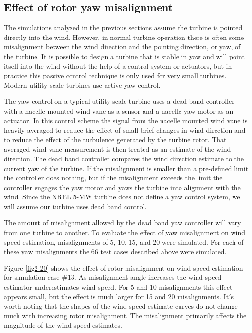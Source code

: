 \subsection{Effect of rotor yaw misalignment}\label{section2-4-2} 

The simulations analyzed in the previous sections assume the turbine is pointed directly into the wind. However, in normal turbine operation there is often some misalignment between the wind direction and the pointing direction, or yaw, of the turbine. It is possible to design a turbine that is stable in yaw and will point itself into the wind without the help of a control system or actuators, but in practice this passive control technique is only used for very small turbines. Modern utility scale turbines use active yaw control.\cite{burton2011}

The yaw control on a typical utility scale turbine uses a dead band controller with a nacelle mounted wind vane as a sensor and a nacelle yaw motor as an actuator.\cite{burton2011} In this control scheme the signal from the nacelle mounted wind vane is heavily averaged to reduce the effect of small brief changes in wind direction and to reduce the effect of the turbulence generated by the turbine rotor. That averaged wind vane measurement is then treated as an estimate of the wind direction. The dead band controller compares the wind direction estimate to the current yaw of the turbine. If the misalignment is smaller than a pre-defined limit the controller does nothing, but if the misalignment exceeds the limit the controller engages the yaw motor and yaws the turbine into alignment with the wind. Since the NREL 5-MW turbine does not define a yaw control system, we will assume our turbine uses dead band control.

The amount of misalignment allowed by the dead band yaw controller will vary from one turbine to another. To evaluate the effect of yaw misalignment on wind speed estimation, misalignments of 5\degree, 10\degree, 15\degree, and 20\degree{} were simulated. For each of these yaw misalignments the 66 test cases described above were simulated.

Figure \ref{fig2-20} shows the effect of rotor misalignment on wind speed estimation for simulation case \#13. As misalignment angle increases the wind speed estimator underestimates wind speed. For 5\degree{} and 10\degree{} misalignments this effect appears small, but the effect is much larger for 15\degree{} and 20\degree{} misalignments. It$'$s worth noting that the shapes of the wind speed estimate curves do not change much with increasing rotor misalignment. The misalignment primarily affects the magnitude of the wind speed estimates. 


